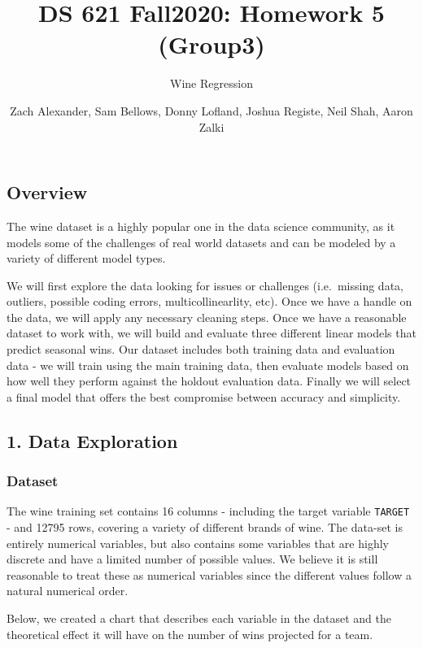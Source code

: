 \documentclass[
]{article}
\title{DS 621 Fall2020: Homework 5 (Group3)}
\subtitle{Wine Regression}
\author{Zach Alexander, Sam Bellows, Donny Lofland, Joshua Registe, Neil Shah,
Aaron Zalki}
\date{}
\begin{document}
\maketitle

\hypertarget{overview}{%
\subsection{Overview}\label{overview}}

The wine dataset is a highly popular one in the data science community,
as it models some of the challenges of real world datasets and can be
modeled by a variety of different model types.

We will first explore the data looking for issues or challenges
(i.e.~missing data, outliers, possible coding errors,
multicollinearlity, etc). Once we have a handle on the data, we will
apply any necessary cleaning steps. Once we have a reasonable dataset to
work with, we will build and evaluate three different linear models that
predict seasonal wins. Our dataset includes both training data and
evaluation data - we will train using the main training data, then
evaluate models based on how well they perform against the holdout
evaluation data. Finally we will select a final model that offers the
best compromise between accuracy and simplicity.

\hypertarget{data-exploration}{%
\subsection{1. Data Exploration}\label{data-exploration}}

\hypertarget{dataset}{%
\subsubsection{Dataset}\label{dataset}}

The wine training set contains 16 columns - including the target
variable \texttt{TARGET} - and 12795 rows, covering a variety of
different brands of wine. The data-set is entirely numerical variables,
but also contains some variables that are highly discrete and have a
limited number of possible values. We believe it is still reasonable to
treat these as numerical variables since the different values follow a
natural numerical order.

Below, we created a chart that describes each variable in the dataset
and the theoretical effect it will have on the number of wins projected
for a team.
\end{document}
